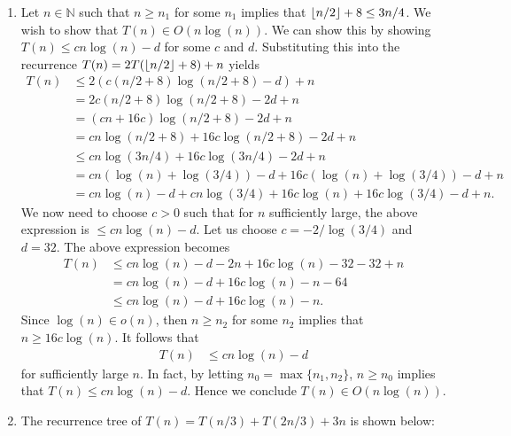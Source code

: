 \documentclass[11pt, letterpaper, titlepage]{article}
\DeclarePairedDelimiter\floor{\lfloor}{\rfloor}
\begin{document}
\begin{enumerate}[label=\alph*)]
    \item Let $n \in \mathbb{N}$ such that $n \geq n_1$ for some $n_1$ implies that $\floor*{n/2} + 8 \leq 3n/4$. We wish to show that $T(n) \in O(n\log(n))$. We can show this by showing $T(n) \leq cn\log(n) - d$ for some $c$ and $d$. Substituting this into the recurrence $T(n) = 2T(\floor*{n/2} + 8) + n$ yields
    \begin{align}
        T(n) &\leq 2( c(n/2 + 8) \log(n/2 + 8) - d ) + n \\
        &= 2c(n/2 + 8) \log(n/2 + 8) - 2d + n \\
        &= (cn + 16c) \log(n/2 + 8) - 2d + n \\
        &= cn\log(n/2 + 8) + 16c\log(n/2 + 8) - 2d + n \\
        &\leq cn\log(3n/4) + 16c\log(3n/4) - 2d + n \\
        &= cn(\log(n) + \log(3/4)) - d + 16c(\log(n) + \log(3/4)) - d + n \\
        &= cn\log(n) - d + cn\log(3/4) + 16c\log(n) + 16c\log(3/4) - d + n. 
    \end{align}
    We now need to choose $c > 0$ such that for $n$ sufficiently large, the above expression is $\leq cn\log(n) - d$. Let us choose $c = -2 / \log(3/4)$ and $d = 32$. The above expression becomes
    \begin{align}
        T(n) &\leq cn\log(n) - d - 2n + 16c\log(n) -32 - 32 + n \\
        &= cn\log(n) - d + 16c\log(n) - n - 64 \\
        &\leq cn\log(n) - d + 16c\log(n) - n.
    \end{align}
    Since $\log(n) \in o(n)$, then $n \geq n_2$ for some $n_2$ implies that $n \geq 16c\log(n)$. It follows that 
    \begin{align}
        T(n) &\leq cn\log(n) - d
    \end{align}
    for sufficiently large $n$. In fact, by letting $n_0 = \max\{n_1, n_2\}$, $n \geq n_0$ implies that $T(n) \leq cn\log(n) - d$. Hence we conclude $T(n) \in O(n\log(n))$.

    \item The recurrence tree of $T(n) = T(n/3) + T(2n/3) + 3n$ is shown below:
    

\end{enumerate}
\end{document}
